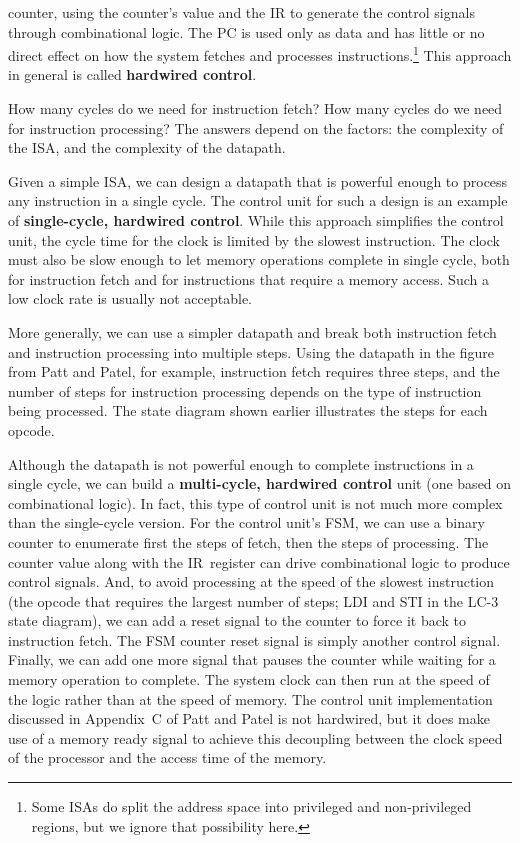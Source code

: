 counter, using the counter's value and the IR to generate the
control signals through combinational
logic.  The PC is used only as data and has little or no direct effect on 
how the system fetches and processes instructions.\footnote{Some ISAs do 
split the address space into privileged and non-privileged regions, but 
we ignore that possibility here.}
%
This approach in general is called {\bf hardwired control}.

How many cycles do we need for instruction fetch?  How many cycles do
we need for instruction processing?  The answers depend on the factors:
the complexity of the ISA, and the complexity of the datapath.

Given a simple ISA, we can design a datapath that
is powerful enough to process any instruction in a single cycle.  
The control unit for such a design is
an example of {\bf single-cycle, hardwired control}.  While this
approach simplifies the control unit, the cycle time
for the clock is limited by the slowest instruction.
The clock must also be slow enough to let memory 
operations complete in single cycle, both for instruction fetch and
for instructions that require a memory access.
%
Such a low clock rate is usually not acceptable.

More generally, we can use a simpler datapath and break both instruction
fetch and instruction processing into multiple steps.  Using the datapath
in the figure from Patt and Patel, for example, instruction fetch requires 
three steps, and the number of steps for instruction processing depends 
on the type of instruction being processed.  The state diagram shown
earlier illustrates the steps for each opcode.

Although the datapath is not powerful enough to complete instructions
in a single cycle, we can build a {\bf multi-cycle, hardwired control} 
unit (one based on combinational logic).  
%
In fact, this type of control unit is not much more complex than the 
single-cycle version.  For the control unit's FSM, we can use a binary 
counter to enumerate first the steps of fetch, then the steps
of processing.  The counter value along with the IR~register can 
drive combinational logic to produce control signals.  And, to avoid
processing at the speed of the slowest instruction (the opcode that
requires the largest number of steps; LDI and STI in the \mbox{LC-3}
state diagram), we can add a reset signal to the counter to force it 
back to instruction fetch.  The FSM counter reset signal is simply 
another control signal.  Finally, we can add one more signal that 
pauses the counter while waiting for a memory operation to complete.  
The system clock can then run at the speed of the logic rather than 
at the speed of memory.
%
The control unit implementation discussed in Appendix~C of Patt and Patel 
is not hardwired, but it does make use of a memory ready signal to 
achieve this decoupling between the clock speed of the processor and the
access time of the memory.


